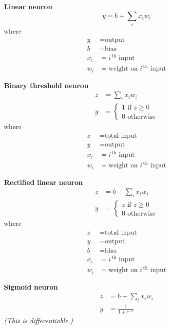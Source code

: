 \bigskip
\textbf{Linear neuron}
\begin{displaymath}
  y = b + \sum_i x_i w_i
\end{displaymath}
where
\begin{align*}
  y & = \text{output} \\
  b & = \text{bias} \\
  x_i & = \text{$i^\mathrm{\,th}$ input} \\
  w_i & = \text{weight on $i^\mathrm{\,th}$ input}
\end{align*}


\bigskip
\textbf{Binary threshold neuron}
\begin{align*}
  z & = \sum_i x_i w_i \\[2mm]
  y & = \left\{
      \begin{array}{l}
        1  \text{ if } z \ge 0 \\
        0  \text{ otherwise}        
      \end{array}
  \right.
\end{align*}
where
\begin{align*}
  z & = \text{total input} \\
  y & = \text{output} \\
  x_i & = \text{$i^\mathrm{\,th}$ input} \\
  w_i & = \text{weight on $i^\mathrm{\,th}$ input}
\end{align*}


\bigskip
\textbf{Rectified linear neuron}
\begin{align*}
  z & = b + \sum_i x_i w_i \\[2mm]
  y & = \left\{
      \begin{array}{l}
        z  \text{ if } z \ge 0 \\
        0  \text{ otherwise}        
      \end{array}
  \right.
\end{align*}
where
\begin{align*}
  z & = \text{total input} \\
  y & = \text{output} \\
  b & = \text{bias} \\
  x_i & = \text{$i^\mathrm{\,th}$ input} \\
  w_i & = \text{weight on $i^\mathrm{\,th}$ input}
\end{align*}


\bigskip
\textbf{Sigmoid neuron}
\begin{align*}
  z & = b + \sum_i x_i w_i \\[2mm]
  y & = \frac{1}{1+e^{-z}}
\end{align*}
\textit{(This is differentiable.)}


